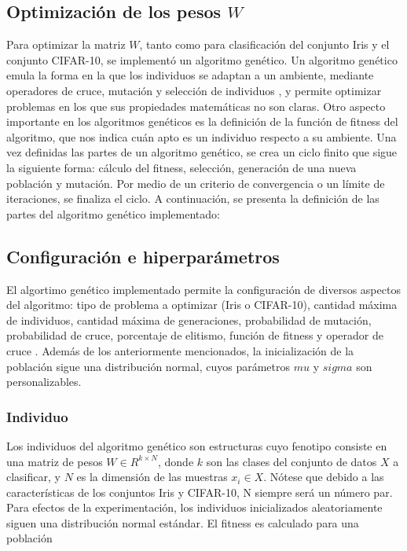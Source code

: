 \documentclass[conference]{IEEEtran}
\begin{document}
\subsection{Optimización de los pesos $W$}
    Para optimizar la matriz $W$, tanto como para clasificación del conjunto Iris y el conjunto CIFAR-10, se implementó un algoritmo genético. Un algoritmo genético emula la forma en la que los individuos se adaptan a un ambiente, mediante operadores de cruce, mutación y selección de individuos \cite{Melanie1998}, y permite optimizar problemas en los que sus propiedades matemáticas no son claras. Otro aspecto importante en los algoritmos genéticos es la definición de la función de fitness del algoritmo, que nos indica cuán apto es un individuo respecto a su ambiente. Una vez definidas las partes de un algoritmo genético, se crea un ciclo finito que sigue la siguiente forma: cálculo del fitness, selección, generación de una nueva población y mutación. Por medio de un criterio de convergencia o un límite de iteraciones, se finaliza el ciclo.
    A continuación, se presenta la definición de las partes del algoritmo genético implementado:
    \subsection{Configuración e hiperparámetros}
    El algortimo genético implementado permite la configuración de diversos aspectos del algoritmo: tipo de problema a optimizar (Iris o CIFAR-10), cantidad máxima de individuos, cantidad máxima de generaciones, probabilidad de mutación, probabilidad de cruce, porcentaje de elitismo, función de fitness y operador de cruce . Además de los anteriormente mencionados, la inicialización de la población sigue una distribución normal, cuyos parámetros $mu$ y $sigma$ son personalizables.
    \subsubsection{Individuo}
    Los individuos del algoritmo genético son estructuras cuyo fenotipo consiste en una matriz de pesos $W \in R^{k \times N}$, donde $k$ son las clases del conjunto de datos $X$ a clasificar, y $N$ es la dimensión de las muestras $x_i \in X$. Nótese que debido a las características de los conjuntos Iris y CIFAR-10, N siempre será un número par. Para efectos de la experimentación, los individuos inicializados aleatoriamente siguen una distribución normal estándar. El fitness es calculado para una población 
\end{document}
